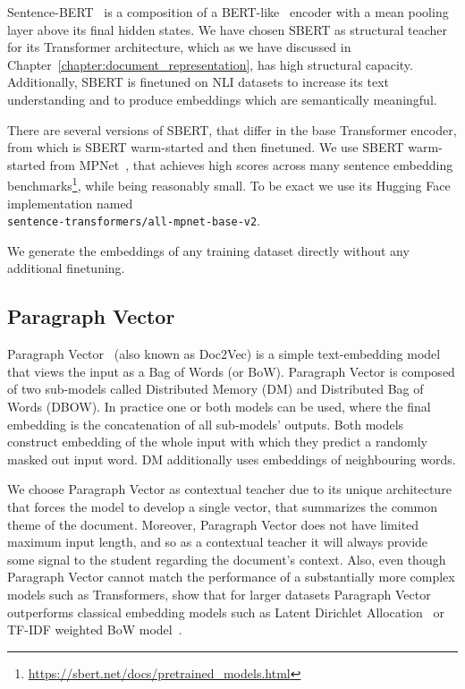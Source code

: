 Sentence-BERT~\citep{reimers2019sentence} is a composition of a
BERT-like~\citep{devlin2019bert} encoder with a mean pooling layer above its
final hidden states. We have chosen SBERT as structural teacher for its
Transformer architecture, which as we have discussed in
Chapter~\ref{chapter:document_representation}, has high structural capacity.
Additionally, SBERT is finetuned on NLI datasets to increase its text
understanding and to produce embeddings which are semantically meaningful.

There are several versions of SBERT, that differ in the base Transformer
encoder, from which is SBERT warm-started and then finetuned. We use SBERT
warm-started from MPNet~\citep{song2020mpnet}, that achieves high scores across
many sentence embedding
benchmarks\footnote{\url{https://sbert.net/docs/pretrained_models.html}}, while
being reasonably small. To be exact we use its Hugging Face implementation
named \\ \texttt{sentence-transformers/all-mpnet-base-v2}.

We generate the embeddings of any training dataset directly without any
additional finetuning.

\subsection{Paragraph Vector}\label{section:paragraph_vector}

Paragraph Vector~\citep{le2014distributed} (also known as Doc2Vec) is a simple
text-embedding model that views the input as a Bag of Words (or BoW). Paragraph
Vector is composed of two sub-models called Distributed Memory (DM) and
Distributed Bag of Words (DBOW). In practice one or both models can be used,
where the final embedding is the concatenation of all sub-models' outputs. Both
models construct embedding of the whole input with which they predict a
randomly masked out input word. DM additionally uses embeddings of neighbouring
words.

We choose Paragraph Vector as contextual teacher due to its unique architecture
that forces the model to develop a single vector, that summarizes the common
theme of the document. Moreover, Paragraph Vector does not have limited maximum
input length, and so as a contextual teacher it will always provide some signal
to the student regarding the document's context. Also, even though Paragraph
Vector cannot match the performance of a substantially more complex models such
as Transformers, \cite{dai2015document} show that for larger datasets Paragraph
Vector outperforms classical embedding models such as Latent Dirichlet
Allocation~\citep{blei2003latent} or TF-IDF weighted BoW
model~\citep{harris1954distributional}.

